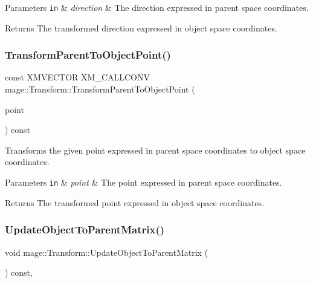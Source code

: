 \begin{DoxyParams}[1]{Parameters}
\mbox{\tt in}  & {\em direction} & The direction expressed in parent space coordinates. \\
\hline
\end{DoxyParams}
\begin{DoxyReturn}{Returns}
The transformed direction expressed in object space coordinates. 
\end{DoxyReturn}
\hypertarget{structmage_1_1_transform_a4b420feb6f839d045a0239056b47772d}{}\label{structmage_1_1_transform_a4b420feb6f839d045a0239056b47772d} 
\subsubsection{\texorpdfstring{Transform\+Parent\+To\+Object\+Point()}{TransformParentToObjectPoint()}}
{\footnotesize\ttfamily const X\+M\+V\+E\+C\+T\+OR X\+M\+\_\+\+C\+A\+L\+L\+C\+O\+NV mage\+::\+Transform\+::\+Transform\+Parent\+To\+Object\+Point (\begin{DoxyParamCaption}\item[{F\+X\+M\+V\+E\+C\+T\+OR}]{point }\end{DoxyParamCaption}) const\hspace{0.3cm}{\ttfamily [noexcept]}}

Transforms the given point expressed in parent space coordinates to object space coordinates.


\begin{DoxyParams}[1]{Parameters}
\mbox{\tt in}  & {\em point} & The point expressed in parent space coordinates. \\
\hline
\end{DoxyParams}
\begin{DoxyReturn}{Returns}
The transformed point expressed in object space coordinates. 
\end{DoxyReturn}
\hypertarget{structmage_1_1_transform_ae959687d6ffe73bda0a71f2f6f4b9dbe}{}\label{structmage_1_1_transform_ae959687d6ffe73bda0a71f2f6f4b9dbe} 
\subsubsection{\texorpdfstring{Update\+Object\+To\+Parent\+Matrix()}{UpdateObjectToParentMatrix()}}
{\footnotesize\ttfamily void mage\+::\+Transform\+::\+Update\+Object\+To\+Parent\+Matrix (\begin{DoxyParamCaption}{ }\end{DoxyParamCaption}) const\hspace{0.3cm}{\ttfamily [private]}, {\ttfamily [noexcept]}}

